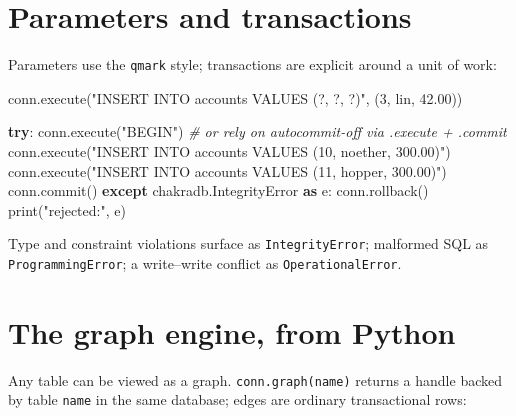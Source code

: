 \documentclass[
  11pt,
  openany]{book}
\newenvironment{Shaded}{}{}
\newcommand{\BuiltInTok}[1]{\textcolor[rgb]{0.00,0.50,0.00}{#1}}
\newcommand{\CommentTok}[1]{\textcolor[rgb]{0.38,0.63,0.69}{\textit{#1}}}
\newcommand{\ControlFlowTok}[1]{\textcolor[rgb]{0.00,0.44,0.13}{\textbf{#1}}}
\newcommand{\DecValTok}[1]{\textcolor[rgb]{0.25,0.63,0.44}{#1}}
\newcommand{\FloatTok}[1]{\textcolor[rgb]{0.25,0.63,0.44}{#1}}
\newcommand{\ImportTok}[1]{\textcolor[rgb]{0.00,0.50,0.00}{\textbf{#1}}}
\newcommand{\NormalTok}[1]{#1}
\newcommand{\StringTok}[1]{\textcolor[rgb]{0.25,0.44,0.63}{#1}}
\begin{document}
\section{Parameters and transactions}\label{parameters-and-transactions}

Parameters use the \texttt{qmark} style; transactions are explicit
around a unit of work:

\begin{Shaded}
\begin{Highlighting}[]
\NormalTok{conn.execute(}\StringTok{"INSERT INTO accounts VALUES (?, ?, ?)"}\NormalTok{, (}\DecValTok{3}\NormalTok{, }\StringTok{\textquotesingle{}lin\textquotesingle{}}\NormalTok{, }\FloatTok{42.00}\NormalTok{))}

\ControlFlowTok{try}\NormalTok{:}
\NormalTok{    conn.execute(}\StringTok{"BEGIN"}\NormalTok{)  }\CommentTok{\# or rely on autocommit{-}off via .execute + .commit}
\NormalTok{    conn.execute(}\StringTok{"INSERT INTO accounts VALUES (10, \textquotesingle{}noether\textquotesingle{}, 300.00)"}\NormalTok{)}
\NormalTok{    conn.execute(}\StringTok{"INSERT INTO accounts VALUES (11, \textquotesingle{}hopper\textquotesingle{}, 300.00)"}\NormalTok{)}
\NormalTok{    conn.commit()}
\ControlFlowTok{except}\NormalTok{ chakradb.IntegrityError }\ImportTok{as}\NormalTok{ e:}
\NormalTok{    conn.rollback()}
    \BuiltInTok{print}\NormalTok{(}\StringTok{"rejected:"}\NormalTok{, e)}
\end{Highlighting}
\end{Shaded}

Type and constraint violations surface as \texttt{IntegrityError};
malformed SQL as \texttt{ProgrammingError}; a write--write conflict as
\texttt{OperationalError}.

\section{The graph engine, from
Python}\label{the-graph-engine-from-python}

Any table can be viewed as a graph. \texttt{conn.graph(name)} returns a
handle backed by table \texttt{name} in the same database; edges are
ordinary transactional rows:
\end{document}
